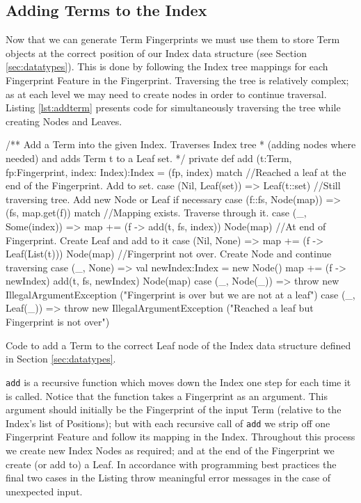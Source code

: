 \subsection{Adding Terms to the Index}
Now that we can generate Term Fingerprints we must use them to store Term objects
at the correct position of our Index data structure (see Section \ref{sec:datatypes}).
This is done by following the Index tree mappings for each Fingerprint Feature in
the Fingerprint. Traversing the tree is relatively complex; as at each
level we may need to create nodes in order to continue traversal. Listing \ref{lst:addterm}
presents code for simultaneously traversing the tree while creating Nodes and Leaves.
\begin{listing}[H]
\begin{scalacode}
/** Add a Term into the given Index. Traverses Index tree
  * (adding nodes where needed) and adds Term t to a Leaf set. */
private def add (t:Term, fp:Fingerprint, index: Index):Index =
(fp, index)  match {
  //Reached a leaf at the end of the Fingerprint. Add to set.
  case (Nil,   Leaf(set)) => Leaf(t::set)
  //Still traversing tree. Add new Node or Leaf if necessary
  case (f::fs, Node(map)) => (fs, map.get(f)) match {
    //Mapping exists. Traverse through it.
    case (_,   Some(index)) => {map += (f -> add(t, fs, index))
                                Node(map)}
    //At end of Fingerprint. Create Leaf and add to it
    case (Nil, None) => {map += (f -> Leaf(List(t)))
                         Node(map)}
    //Fingerprint not over. Create Node and continue traversing
    case (_,   None) => {val newIndex:Index = new Node()
                         map += (f -> newIndex)
                         add(t, fs, newIndex)
                         Node(map)}
  }
  case (_, Node(_)) => throw new IllegalArgumentException
                ("Fingerprint is over but we are not at a leaf")
  case (_, Leaf(_)) => throw new IllegalArgumentException
                ("Reached a leaf but Fingerprint is not over")
}
\end{scalacode}
\caption{Code to add a Term to the correct Leaf node of the Index data
structure defined in Section \ref{sec:datatypes}.}
\label{lst:addterm}
\end{listing}
\verb!add! is a recursive function which moves down the Index one step for
each time it is called. Notice that the function takes a Fingerprint as an argument. This argument
should initially be the Fingerprint of the input Term (relative to the Index's list of Positions);
but with each recursive call of \verb!add! we strip off one Fingerprint Feature and follow
its mapping in the Index. Throughout this process we create new Index Nodes as required;
and at the end of the Fingerprint we create (or add to) a Leaf.
In accordance with programming best practices the final two cases in the Listing
throw meaningful error messages in the case of unexpected input.

